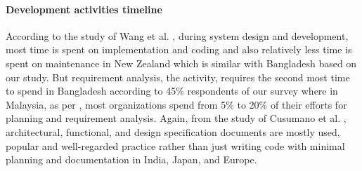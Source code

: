 \paragraph{Development activities timeline}
According to the study of Wang et al. \cite{Wang2018}, during system design and development, most time is spent on implementation and coding and also relatively less time is spent on maintenance in New Zealand which is similar with Bangladesh based on our study. But requirement analysis, the activity, requires the second most time to spend in Bangladesh according to 45\% respondents of our survey where in Malaysia, as per \cite{Baharom2006}, most organizations spend from 5\% to 20\% of their efforts for planning and requirement analysis. Again, from the study of Cusumano et al. \cite{Cusumano2003}, architectural, functional, and design specification documents are mostly used, popular and well-regarded practice rather than just writing code with minimal planning and documentation in India, Japan, and Europe.
